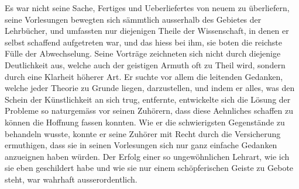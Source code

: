 \documentclass[11pt]{article}
\begin{document}
Es war nicht seine Sache, Fertiges und Ueberliefertes von neuem zu überliefern, seine Vorlesungen bewegten sich sämmtlich ausserhalb des Gebietes der Lehrbücher, und umfassten nur diejenigen Theile der Wissenschaft, in denen er selbst schaffend aufgetreten war, und das hiess bei ihm, sie boten die reichste Fülle der Abwechselung. Seine Vorträge zeichneten sich nicht durch diejenige Deutlichkeit aus, welche auch der geistigen Armuth oft zu Theil wird, sondern durch eine Klarheit höherer Art. Er suchte vor allem die leitenden Gedanken, welche jeder Theorie zu Grunde liegen, darzustellen, und indem er alles, was den Schein der Künstlichkeit an sich trug, entfernte, entwickelte sich die Lösung der Probleme so naturgemäss vor seinen Zuhörern, dass diese Aehnliches schaffen zu können die Hoffnung fassen konnten. Wie er die schwierigsten Gegenstände zu behandeln wusste, konnte er seine Zuhörer mit Recht durch die Versicherung ermuthigen, dass sie in seinen Vorlesungen sich nur ganz einfache Gedanken anzueignen haben würden. Der Erfolg einer so ungewöhnlichen Lehrart, wie ich sie eben geschildert habe und wie sie nur einem schöpferischen Geiste zu Gebote steht, war wahrhaft ausserordentlich.
\end{document}

